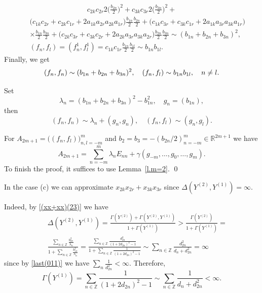 \documentclass[preprint,12pt]{elsarticle}
\numberwithin{equation}{section}
\begin{document}
\begin{pf}
\begin{eqnarray*}
c_{2k}c_{2r}2\Big(\frac{b_{2n}}{2}\Big)^2+
c_{3k}c_{3r}2\Big(\frac{b_{3n}}{2}\Big)^2+
\end{eqnarray*}
\begin{eqnarray*}
&&
\big(c_{1k}c_{2r}+c_{2k}c_{1r}+2a_{1k}a_{2r}a_{2k}a_{1r}\big)\frac{b_{1n}}{2}\frac{b_{2n}}{2}+\big(c_{1k}c_{3r}
+c_{3k}c_{1r}+2a_{1k}a_{3r}a_{3k}a_{1r}\big) \\
&&
\times\frac{b_{1n}}{2}\frac{b_{3n}}{2}+
\big(c_{2k}c_{3r}+c_{3k}c_{2r}+2a_{2k}a_{3r}a_{3k}a_{2r}\big)\frac{b_{2n}}{2}\frac{b_{3n}}{2} \sim(b_{1n}+b_{2n}+b_{3n})^2,\\ 
&&(f_n,f_l)=(f_n^1,f_l^1)=
c_{1k}c_{1r}\frac{b_{1n}}{2}\frac{b_{1l}}{2}\sim b_{1n}b_{1l}.
\end{eqnarray*}
Finally, we get
\begin{equation}
\label{(A_{r,s}),xx+xx,m=3}
(f_n,f_n) \sim (b_{1n}+b_{2n}+b_{3n})^2, \quad
(f_n,f_l)\sim b_{1n}b_{1l}
,\quad n\not=l.
\end{equation}

Set
\begin{equation}
\lambda_n=(b_{1n}+b_{2n}+b_{3n})^2-b_{1n}^2,\quad g_n=(b_{1n}),
\end{equation}
then
\begin{equation}
(f_n,f_n)\sim \lambda_n+(g_n,g_n),\quad (f_n,f_l)\sim (g_n,g_l).
\end{equation}

For $A_{2m+1}=\big((f_n,f_l)\big)_{n,l=-m}^m$ and
$b_2=b_3=-(b_{2n}/2)_{n=-m}^m\in {\mathbb R}^{2m+1}$ we have
$$
A_{2m+1}= \sum_{n=-m}^m\lambda_nE_{nn}+\gamma(g_{-m},\dots,g_0,\dots,g_m).
$$
To finish the proof, it  suffices to use  Lemma~\ref{l.m=2}.
\qed\end{pf}
%
\begin{rem}
\label{r.(xx+xx)(23)}
In the case (c) we can approximate $x_{2k}x_{2r}+x_{3k}x_{3r}$ since $\Delta(Y^{(2)},Y^{(1)})\!=\!\infty$.
\end{rem}
Indeed, by \eqref{(xx+xx)(23)} we have
\begin{eqnarray*}
 &&
 \Delta(Y^{(2)},Y^{(1)})=\frac{\Gamma(Y^{(2)})\!+\!\Gamma(Y^{(2)},Y^{(1)})}{1+\Gamma(Y^{(1)})}>
 \frac{\Gamma(Y^{(2)})}{1+\Gamma(Y^{(1)})}=\\
 &&
 \frac{\sum_{n\in \mathbb Z}\frac{b^2_{2n}}{\lambda_n}}
 {1+\sum_{n\in \mathbb Z}\frac{b^2_{1n}}{\lambda_n}}=
 \frac{\sum_{n\in \mathbb Z}\frac{d^2_{2n}}{(1+2d_{2n})^2-1}}
 {1+\sum_{n\in \mathbb Z}\frac{1}{(1+2d_{2n})^2-1}}\sim
  \sum_{n\in \mathbb Z}\frac{d^2_{2n}}{d_n+d^2_{2n}}=\infty
\end{eqnarray*}
since  by \eqref{last(011)} we have   $\sum_n\frac{1}{d^2_{2n}}<\infty$. Therefore,
\begin{equation*}
\Gamma(Y^{(1)})=\sum_{n\in \mathbb Z}\frac{1}{(1+2d_{2n})^2-1}
 \sim
  \sum_{n\in \mathbb Z}\frac{1}{d_n+d^2_{2n}}<\infty. 
\end{equation*}
\end{document}

